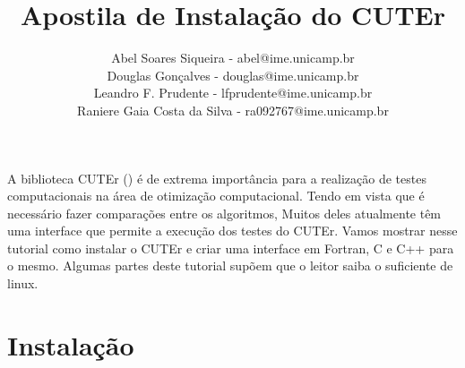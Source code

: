 \documentclass[letterpaper,11pt]{article}
\title{Apostila de Instalação do CUTEr}
\author{
Abel Soares Siqueira - {\small abel@ime.unicamp.br} \\ 
Douglas Gonçalves - {\small douglas@ime.unicamp.br} \\
Leandro F. Prudente - {\small lfprudente@ime.unicamp.br} \\
Raniere Gaia Costa da Silva - {\small ra092767@ime.unicamp.br}}
\numberwithin{equation}{section}
\begin{document}
\maketitle
\tableofcontents
\vspace{1 cm}

A biblioteca CUTEr (\cite{bib:cuter1,bib:cuter2}) é de extrema importância para a
realização de testes computacionais na área de otimização computacional. 
Tendo em vista que é necessário fazer comparações entre os algoritmos,
Muitos deles atualmente têm uma interface que permite a execução dos testes
do CUTEr. Vamos mostrar nesse tutorial como instalar o CUTEr e criar uma interface
em Fortran, C e C++ para o mesmo. Algumas partes deste tutorial supõem que o leitor
saiba o suficiente de linux.

\section{Instalação}
\end{document}
